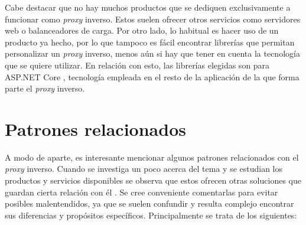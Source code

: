 \documentclass[11pt,spanish,listoffigures]{tfgetsinf}
\begin{document}
Cabe destacar que no hay muchos productos que se dediquen exclusivamente a funcionar como \emph{proxy} inverso. Estos suelen ofrecer otros servicios como servidores web o balanceadores de carga. Por otro lado, lo habitual es hacer uso de un producto ya hecho, por lo que tampoco es fácil encontrar librerías que permitan personalizar un \emph{proxy} inverso, menos aún si hay que tener en cuenta la tecnología que se quiere utilizar. En relación con esto, las librerías elegidas son para ASP.NET Core \cite{DotNetCore}, tecnología empleada en el resto de la aplicación de la que forma parte el \emph{proxy} inverso.


	\section{Patrones relacionados} \label{patronesRelacionados}

A modo de aparte, es interesante mencionar algunos patrones relacionados con el \emph{proxy} inverso. Cuando se investiga un poco acerca del tema y se estudian los productos y servicios disponibles se observa que estos ofrecen otras soluciones que guardan cierta relación con él \cite{ConceptosMicroservicios}. Se cree conveniente comentarlas para evitar posibles malentendidos, ya que se suelen confundir y resulta complejo encontrar sus diferencias y propósitos específicos. Principalmente se trata de los siguientes:
\end{document}
